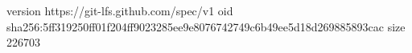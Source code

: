 version https://git-lfs.github.com/spec/v1
oid sha256:5ff319250ff01f204ff9023285ee9e8076742749c6b49ee5d18d269885893cac
size 226703
